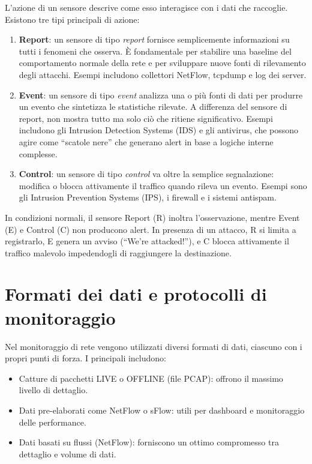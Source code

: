 L'azione di un sensore descrive come esso interagisce con i dati che raccoglie.
Esistono tre tipi principali di azione:

\begin{enumerate}
\item \textbf{Report}: un sensore di tipo \textit{report} fornisce semplicemente
informazioni su tutti i fenomeni che osserva. È fondamentale per stabilire una
baseline del comportamento normale della rete e per sviluppare nuove fonti di
rilevamento degli attacchi. Esempi includono collettori NetFlow, tcpdump e
log dei server.
\item \textbf{Event}: un sensore di tipo \textit{event} analizza una o più
fonti di dati per produrre un evento che sintetizza le statistiche rilevate.
A differenza del sensore di report, non mostra tutto ma solo ciò che ritiene
significativo. Esempi includono gli Intrusion Detection Systems (IDS) e gli
antivirus, che possono agire come ``scatole nere'' che generano alert in base
a logiche interne complesse.
\item \textbf{Control}: un sensore di tipo \textit{control} va oltre la semplice
segnalazione: modifica o blocca attivamente il traffico quando rileva un evento.
Esempi sono gli Intrusion Prevention Systems (IPS), i firewall e i sistemi
antispam.
\end{enumerate}

In condizioni normali, il sensore Report (R) inoltra l'osservazione, mentre
Event (E) e Control (C) non producono alert. In presenza di un attacco, R
si limita a registrarlo, E genera un avviso (``We're attacked!''), e C blocca
attivamente il traffico malevolo impedendogli di raggiungere la destinazione.

\section{Formati dei dati e protocolli di monitoraggio}

Nel monitoraggio di rete vengono utilizzati diversi formati di dati, ciascuno
con i propri punti di forza. I principali includono:
\begin{itemize}
\item Catture di pacchetti LIVE o OFFLINE (file PCAP): offrono il massimo
livello di dettaglio.
\item Dati pre-elaborati come NetFlow o sFlow: utili per dashboard e
monitoraggio delle performance.
\item Dati basati su flussi (NetFlow): forniscono un ottimo compromesso
tra dettaglio e volume di dati.
\end{itemize}

